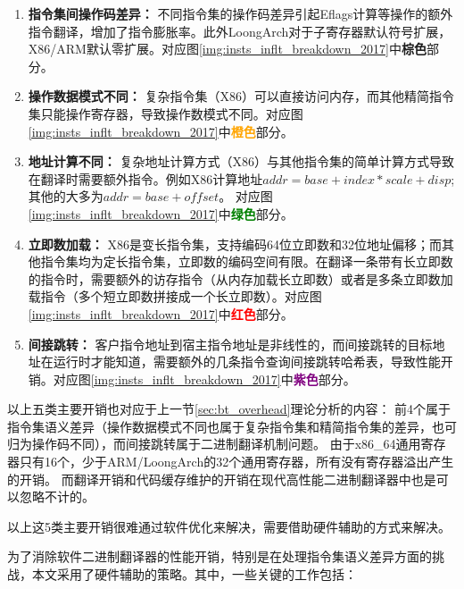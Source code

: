 \begin{enumerate}
  \item \textbf{指令集间操作码差异：} 不同指令集的操作码差异引起Eflags计算等操作的额外指令翻译，增加了指令膨胀率。此外LoongArch对于子寄存器默认符号扩展，X86/ARM默认零扩展。对应图\ref{img:insts_inflt_breakdown_2017}中\textcolor{Sepia}{\textbf{棕色}}部分。
  
  \item \textbf{操作数据模式不同：} 复杂指令集（X86）可以直接访问内存，而其他精简指令集只能操作寄存器，导致操作数模式不同。对应图\ref{img:insts_inflt_breakdown_2017}中\textcolor{orange}{\textbf{橙色}}部分。
  
  \item \textbf{地址计算不同：} 复杂地址计算方式（X86）与其他指令集的简单计算方式导致在翻译时需要额外指令。例如X86计算地址$addr = base + index * scale +disp$; 其他的大多为$addr = base + offset$。 对应图\ref{img:insts_inflt_breakdown_2017}中\textcolor{green}{\textbf{绿色}}部分。
  
  \item \textbf{立即数加载：} X86是变长指令集，支持编码64位立即数和32位地址偏移；而其他指令集均为定长指令集，立即数的编码空间有限。在翻译一条带有长立即数的指令时，需要额外的访存指令（从内存加载长立即数）或者是多条立即数加载指令（多个短立即数拼接成一个长立即数）。对应图\ref{img:insts_inflt_breakdown_2017}中\textcolor{red}{\textbf{红色}}部分。
  
  \item \textbf{间接跳转：} 客户指令地址到宿主指令地址是非线性的，而间接跳转的目标地址在运行时才能知道，需要额外的几条指令查询间接跳转哈希表，导致性能开销。对应图\ref{img:insts_inflt_breakdown_2017}中\textcolor{Purple}{\textbf{紫色}}部分。
  
\end{enumerate}

以上五类主要开销也对应于上一节\ref{sec:bt_overhead}理论分析的内容：
前4个属于指令集语义差异（操作数据模式不同也属于复杂指令集和精简指令集的差异，也可归为操作码不同），而间接跳转属于二进制翻译机制问题。
由于x86\_64通用寄存器只有16个，少于ARM/LoongArch的32个通用寄存器，所有没有寄存器溢出产生的开销。
而翻译开销和代码缓存维护的开销在现代高性能二进制翻译器中也是可以忽略不计的。


以上这5类主要开销很难通过软件优化来解决，需要借助硬件辅助的方式来解决。

为了消除软件二进制翻译器的性能开销，特别是在处理指令集语义差异方面的挑战，本文采用了硬件辅助的策略。其中，一些关键的工作包括：

